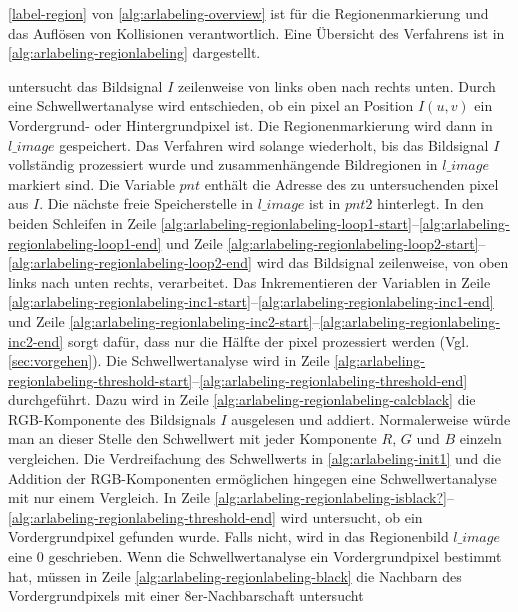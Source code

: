 \autoref{label-region} von \autoref{alg:arlabeling-overview} ist für die Regionenmarkierung und das Auflösen von
 Kollisionen verantwortlich. Eine Übersicht des Verfahrens ist in \autoref{alg:arlabeling-regionlabeling} dargestellt.

  untersucht das Bildsignal $I$ zeilenweise von links oben nach rechts unten. Durch eine
 Schwellwertanalyse wird entschieden, ob ein \gls{pixel} an Position $I(u,v)$ ein Vordergrund- oder Hintergrundpixel
 ist. Die Regionenmarkierung wird dann in $\mathit{l\_image}$ gespeichert. Das Verfahren wird solange wiederholt, bis
 das Bildsignal $I$ vollständig prozessiert wurde und zusammenhängende Bildregionen in $\mathit{l\_image}$ markiert
 sind. Die Variable $\mathit{pnt}$ enthält die Adresse des zu untersuchenden \gls{pixel} aus $I$. Die nächste freie
 Speicherstelle in $\mathit{l\_image}$ ist in $\mathit{pnt2}$ hinterlegt. In den beiden Schleifen in Zeile
 \ref{alg:arlabeling-regionlabeling-loop1-start}--\ref{alg:arlabeling-regionlabeling-loop1-end} und Zeile
 \ref{alg:arlabeling-regionlabeling-loop2-start}--\ref{alg:arlabeling-regionlabeling-loop2-end} wird das Bildsignal
 zeilenweise, von oben links nach unten rechts, verarbeitet. Das Inkrementieren der Variablen in Zeile
 \ref{alg:arlabeling-regionlabeling-inc1-start}--\ref{alg:arlabeling-regionlabeling-inc1-end} und Zeile
 \ref{alg:arlabeling-regionlabeling-inc2-start}--\ref{alg:arlabeling-regionlabeling-inc2-end} sorgt dafür, dass nur die
 Hälfte der \gls{pixel} prozessiert werden (Vgl. \autoref{sec:vorgehen}). Die Schwellwertanalyse wird in Zeile
 \ref{alg:arlabeling-regionlabeling-threshold-start}--\ref{alg:arlabeling-regionlabeling-threshold-end} durchgeführt.
 Dazu wird in Zeile \ref{alg:arlabeling-regionlabeling-calcblack} die RGB-Komponente des Bildsignals $I$ ausgelesen und
 addiert. Normalerweise würde man an dieser Stelle den Schwellwert mit jeder Komponente $R$, $G$ und $B$ einzeln
 vergleichen. Die Verdreifachung des Schwellwerts in \autoref{alg:arlabeling-init1} und die Addition der
 RGB-Komponenten ermöglichen hingegen eine Schwellwertanalyse mit nur einem Vergleich.\label{sub:arlabel-threshold} In
 Zeile \ref{alg:arlabeling-regionlabeling-isblack?}--\ref{alg:arlabeling-regionlabeling-threshold-end} wird
 untersucht, ob ein Vordergrundpixel gefunden wurde. Falls nicht, wird in das Regionenbild $\mathit{l\_image}$ eine $0$
 geschrieben. Wenn die Schwellwertanalyse ein Vordergrundpixel bestimmt hat, müssen in Zeile
 \ref{alg:arlabeling-regionlabeling-black} die Nachbarn des Vordergrundpixels mit einer 8er-Nachbarschaft untersucht
